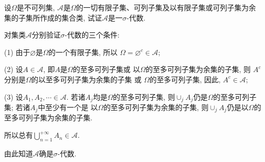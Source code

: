 \begin{yyEx}
	设$\Omega$是不可列集, $\mathscr{A}$是$\Omega$的一切有限子集、可列子集及以有限子集或可列子集为余集的子集所作成的集合类, 试证$\mathscr{A}$是一$\sigma$-代数.
\end{yyEx}
\begin{yyProof}
	对集类$\mathscr{A}$分别验证$\sigma$-代数的三个条件:
	\begin{blist}
		\item[(1)] 由于$\varnothing$是$\Omega$的一个有限子集, 所以 $\Omega = \varnothing^{c} \in \mathscr{A}$;
		\item[(2)] 设$A\in\mathscr{A}$, 即$A$是$\Omega$的至多可列子集或 以$\Omega$的至多可列子集为余集的子集, 则 $A^c$分别是$\Omega$的以至多可列子集为余集的子集 或 $\Omega$的至多可列子集, 因此, $A^c\in\mathscr{A}$;
		
		\item[(3)] 设$A_1,A_2,\cdots \in \mathscr{A}$. 若诸$A_j$均是$\Omega$的至多可列子集, 则$\cup_j A_j$仍是$\Omega$的至多可列子集; 若诸$A_j$中至少有一个是 以$\Omega$的至多可列子集为余集的子集, 则$\cup_j A_j$仍是以$\Omega$的至多可列子集为余集的子集.
		
		所以总有$\bigcup\limits_{n=1}^{+\infty}A_n\in\mathscr{A}$.
	\end{blist}
	由此知道$\mathscr{A}$确是$\sigma$-代数.
\end{yyProof}


